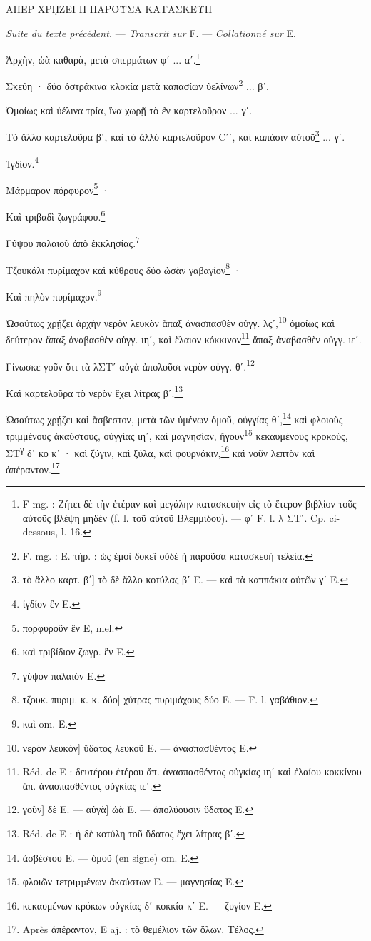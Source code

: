 \documentclass[a4paper, 11pt, oneside, polutonikogreek, french]{article}
\begin{document}
ΑΠΕΡ ΧΡῌΖΕΙ Η ΠΑΡΟΥΣΑ ΚΑΤΑΣΚΕΥΗ

\emph{Suite du texte précédent.} --- \emph{Transcrit sur} F. --- \emph{Collationné sur} E.

\bigskip

Ἀρχὴν, ὠὰ καθαρὰ, μετὰ σπερμάτων φʹ ... αʹ.\footnote{F mg. : Ζήτει δὲ τὴν ἑτέραν καὶ μεγάλην κατασκευὴν εἰς τὸ ἕτερον βιβλίον τοῦς αὐτοῦς βλέψη μηδὲν (f. l. τοῦ αὐτοῦ Βλεμμίδου). --- φʹ F. l. λ ΣΤʹ. Cp. ci-dessous, l. 16.}

Σκεύη · δύο ὀστράκινα κλοκία μετὰ καπασίων ὑελίνων\footnote{F. mg. : Ε. τὴρ. : ὡς ἐμοὶ δοκεῖ οὐδὲ ἡ παροῦσα κατασκευὴ τελεία.} ... βʹ.

Ὁμοίως καὶ ὑέλινα τρία, ἵνα χωρῇ τὸ ἓν καρτελοῦρον ... γʹ.

Τὸ ἄλλο καρτελοῦρα βʹ, καὶ τὸ ἀλλὸ καρτελοῦρον Cʹʹ, καὶ καπάσιν αὐτοῦ\footnote{τὸ ἄλλο καρτ. β΄] τὸ δὲ ἄλλο κοτύλας βʹ E. --- καὶ τὰ καππάκια αὐτῶν γʹ E.} ... γʹ.

Ἰγδίον.\footnote{ἰγδίον ἓν E.}

Μάρμαρον πόρφυρον\footnote{πορφυροῦν ἓν E, mel.} ·

Καὶ τριβαδὶ ζωγράφου.\footnote{καὶ τριβίδιον ζωγρ. ἓν Ε.}

Γύψου παλαιοῦ ἀπὸ ἐκκλησίας.\footnote{γύψον παλαιὸν E.}

Τζουκάλι πυρίμαχον καὶ κύθρους δύο ὡσὰν γαβαγίον\footnote{τζουκ. πυριμ. κ. κ. δύο] χύτρας πυριμάχους δύο E. --- F. l. γαβάθιον.} ·

Καὶ πηλὸν πυρίμαχον.\footnote{καὶ om. E.}

Ὡσαύτως χρῄζει ἀρχὴν νερὸν λευκὸν ἅπαξ ἀνασπασθὲν οὐγγ. λςʹ,\footnote{νερὸν λευκὸν] ὕδατος λευκοῦ E. --- ἀνασπασθέντος E.} ὁμοίως καὶ δεύτερον ἅπαξ ἀναβασθὲν οὐγγ. ιηʹ, καὶ ἔλαιον κόκκινον\footnote{Réd. de E : δευτέρου ἑτέρου ἅπ. ἀνασπασθέντος οὐγκίας ιηʹ καὶ ἐλαίου κοκκίνου ἅπ. ἀνασπασθέντος οὐγκίας ιεʹ.} ἅπαξ ἀναβασθὲν οὐγγ. ιεʹ.

Γίνωσκε γοῦν ὅτι τὰ λΣΤʹ αὐγὰ ἀπολοῦσι νερὸν οὐγγ. θʹ.\footnote{γοῦν] δὲ E. --- αὐγὰ] ὠὰ E. --- ἀπολύουσιν ὕδατος E.}

Καὶ καρτελοῦρα τὸ νερὸν ἔχει λίτρας βʹ.\footnote{Réd. de E : ἡ δὲ κοτύλη τοῦ ὕδατος ἔχει λίτρας βʹ.}

Ὡσαύτως χρῄζει καὶ ἄσβεστον, μετὰ τῶν ὑμένων ὁμοῦ, οὐγγίας θʹ,\footnote{ἀσβέστου E. --- ὁμοῦ (en signe) om. E.} καὶ φλοιοὺς τριμμένους ἀκαύστους, οὐγγίας ιηʹ, καὶ μαγνησίαν, ἤγουν\footnote{φλοιῶν τετριµµένων ἀκαύστων E. --- μαγνησίας E.} κεκαυμένους κροκοὺς, ΣΤ\textsuperscript{γ} δʹ κο κʹ · καὶ ζύγιν, καὶ ξύλα, καὶ φουρνάκιν,\footnote{κεκαυμένων κρόκων οὐγκίας δʹ κοκκία κʹ E. --- ζυγίον E.} καὶ νοῦν λεπτὸν καὶ ἀπέραντον.\footnote{Après ἀπέραντον, E aj. : τὸ θεμέλιον τῶν ὅλων. Τέλος.}
\end{document}
